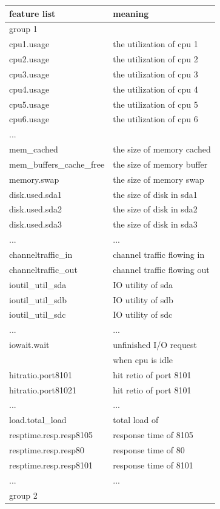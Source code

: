 \documentclass[5p]{elsarticle}
\begin{document}
\begin{table}[]
\centering
\begin{tabular}{|l|l|}
\hline  
feature list & meaning\\
\hline  
group 1 & \\
\hline  
cpu1.usage&the utilization of cpu 1\\
cpu2.usage&the utilization of cpu 2\\
cpu3.usage&the utilization of cpu 3\\
cpu4.usage&the utilization of cpu 4\\
cpu5.usage&the utilization of cpu 5\\
cpu6.usage&the utilization of cpu 6\\
...  \\
mem\_cached & the size of memory cached \\
mem\_buffers\_cache\_free &the size of memory buffer\\
memory.swap & the size of memory swap\\
disk.used.sda1& the size of disk in sda1\\
disk.used.sda2& the size of disk in sda2\\
disk.used.sda3& the size of disk in sda3\\
...&...\\
channeltraffic\_in& channel traffic flowing in\\
channeltraffic\_out& channel traffic flowing out\\
ioutil\_util\_sda& IO utility of sda\\
ioutil\_util\_sdb& IO utility of sdb\\
ioutil\_util\_sdc& IO utility of sdc\\
...&...\\
iowait.wait & unfinished I/O request\\
&  when cpu is idle\\
hitratio.port8101& hit retio of port 8101 \\
hitratio.port81021& hit retio of port 8101 \\
...&...\\
load.total_load & total load of \\
resptime.resp.resp8105 & response time of 8105\\
resptime.resp.resp80 & response time of 80\\
resptime.resp.resp8101 & response time of 8101\\
...&...\\
\hline  
group 2&\\

\end{tabular}
\end{table}
\end{document}
